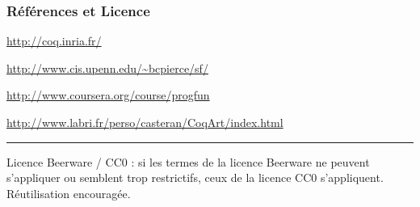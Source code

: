 \documentclass[9pt]{beamer}
\begin{document}
\begin{frame}
\frametitle{Références et Licence}
\maketitle

\url{http://coq.inria.fr/}

\url{http://www.cis.upenn.edu/~bcpierce/sf/}

\url{http://www.coursera.org/course/progfun}

\url{http://www.labri.fr/perso/casteran/CoqArt/index.html}

\rule{5cm}{.1pt}

Licence Beerware / CC0 : si les termes de la licence Beerware ne peuvent s'appliquer ou semblent trop restrictifs, ceux de la licence CC0 s'appliquent.
Réutilisation encouragée.

\end{frame}
\end{document}
